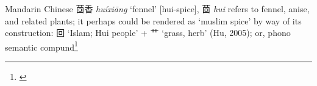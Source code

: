 \begin{etymology}\label{ety:huixiang}
Mandarin Chinese {茴香} \textit{huíxiāng} `fennel' [hui-spice], 茴 \textit{hui} refers to fennel, anise, and related plants; it perhaps could be rendered as `muslim spice' by way of its construction: 回 `Islam; Hui people' +  艹 `grass, herb' (Hu, 2005); or, phono semantic compund\footnote{\textcite{hu_food_2005}}
\end{etymology}